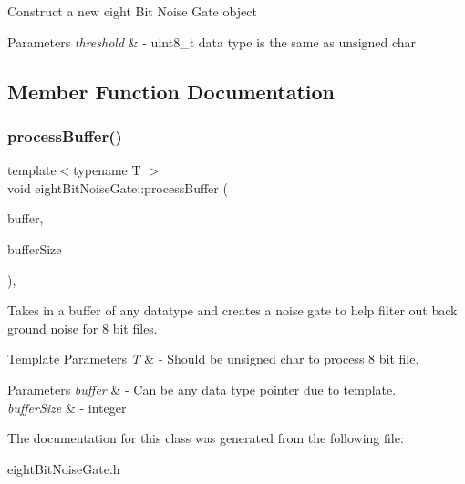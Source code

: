 \begin{DoxyItemize}
\item Construct a new eight Bit Noise Gate object 
\end{DoxyItemize}


\begin{DoxyParams}{Parameters}
{\em threshold} & -\/ uint8\+\_\+t data type is the same as unsigned char \\
\hline
\end{DoxyParams}


\subsection{Member Function Documentation}
\mbox{\label{classeightBitNoiseGate_a2ae5893814bd427a1607e933ee733c48}} 
\subsubsection{\texorpdfstring{process\+Buffer()}{processBuffer()}}
{\footnotesize\ttfamily template$<$typename T $>$ \\
void eight\+Bit\+Noise\+Gate\+::process\+Buffer (\begin{DoxyParamCaption}\item[{T $\ast$}]{buffer,  }\item[{int}]{buffer\+Size }\end{DoxyParamCaption})\hspace{0.3cm}{\ttfamily [inline]}, {\ttfamily [override]}}



Takes in a buffer of any datatype and creates a noise gate to help filter out back ground noise for 8 bit files. 


\begin{DoxyTemplParams}{Template Parameters}
{\em T} & -\/ Should be unsigned char to process 8 bit file. \\
\hline
\end{DoxyTemplParams}

\begin{DoxyParams}{Parameters}
{\em buffer} & -\/ Can be any data type pointer due to template. \\
\hline
{\em buffer\+Size} & -\/ integer \\
\hline
\end{DoxyParams}


The documentation for this class was generated from the following file\+:\begin{DoxyCompactItemize}
\item 
eight\+Bit\+Noise\+Gate.\+h\end{DoxyCompactItemize}

